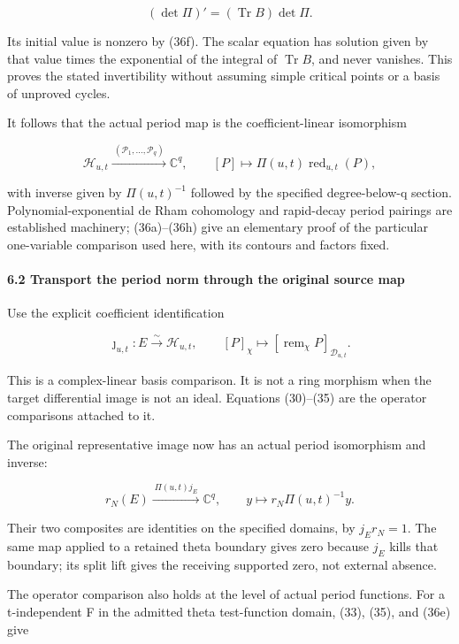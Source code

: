\[
(\det\Pi)'=(\operatorname{Tr}B)\det\Pi.
\tag{36g}
\]

Its initial value is nonzero by (36f). The scalar equation has solution given by that value times the exponential of the integral of \(\operatorname{Tr}B\), and never vanishes. This proves the stated invertibility without assuming simple critical points or a basis of unproved cycles.

It follows that the actual period map is the coefficient-linear isomorphism

\[
\boxed{\mathcal H_{u,t}\xrightarrow{\ (\mathcal P_1,\ldots,\mathcal P_q)\ }\mathbb C^q,
\qquad [P]\longmapsto\Pi(u,t)\operatorname{red}_{u,t}(P),}
\tag{36h}
\]

with inverse given by \(\Pi(u,t)^{-1}\) followed by the specified degree-below-q section. Polynomial-exponential de Rham cohomology and rapid-decay period pairings are established machinery; (36a)--(36h) give an elementary proof of the particular one-variable comparison used here, with its contours and factors fixed.

\paragraph{6.2 Transport the period norm through the original source map}\label{endpoint-exponential_original--transport-the-period-norm-through-the-original-source-map}

Use the explicit coefficient identification

\[
\jmath_{u,t}:E\xrightarrow{\sim}\mathcal H_{u,t},
\qquad[P]_\chi\longmapsto[\operatorname{rem}_\chi P]_{\mathcal D_{u,t}}.
\tag{36i}
\]

This is a complex-linear basis comparison. It is not a ring morphism when the target differential image is not an ideal. Equations (30)--(35) are the operator comparisons attached to it.

The original representative image now has an actual period isomorphism and inverse:

\[
\boxed{r_N(E)\xrightarrow{\ \Pi(u,t)j_E\ }\mathbb C^q,
\qquad y\longmapsto r_N\Pi(u,t)^{-1}y.}
\tag{36j}
\]

Their two composites are identities on the specified domains, by \(j_Er_N=1\). The same map applied to a retained theta boundary gives zero because \(j_E\) kills that boundary; its split lift gives the receiving supported zero, not external absence.

The operator comparison also holds at the level of actual period functions. For a t-independent F in the admitted theta test-function domain, (33), (35), and (36e) give

